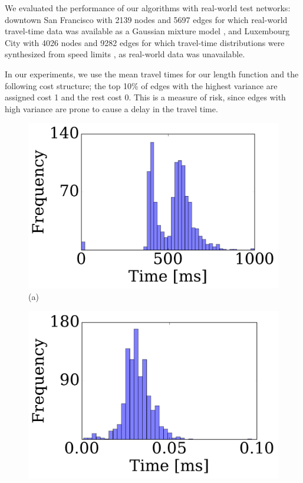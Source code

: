 We evaluated the performance of our algorithms with real-world test networks: downtown San Francisco with 2139 nodes and 5697 edges for which real-world travel-time data was available as a Gaussian mixture model \cite{sf_data}, and Luxembourg City with 4026 nodes and 9282 edges for which travel-time distributions were synthesized from speed limits \cite{niknami2016tractable}, as real-world data was unavailable.
 
In our experiments, we use the mean travel times for our length function and the following cost structure; the top 10\% of edges with the highest variance are assigned cost 1 and the rest cost 0.
This is a measure of risk, since edges with high variance are prone to cause a delay in the travel time.


\begin{figure}
\begin{minipage}[t]{.28\textwidth}
\centering
\includegraphics[clip, trim=0.2cm 0.3cm 0.4cm 0.2cm,scale=0.225]{TexImg/SF_query_dij_B25.pdf}\\
(a)
\end{minipage}%
\begin{minipage}[t]{.24\textwidth}
\centering
\includegraphics[clip, trim=1.65cm 0.3cm 0.2cm 0.2cm,scale=0.225]{TexImg/SF_query_hl_B25.pdf}\\

\end{minipage}
\end{figure}
